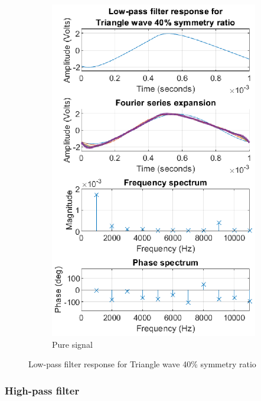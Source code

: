 \documentclass[notitlepage, a4paper, 11pt]{article}
\begin{document}
\begin{figure}[H]
\begin{subfigure}{0.45\textwidth}
			\includegraphics[width=\textwidth]{../Matlab/img/RCLPtri40}
			\caption{Pure signal}
		\end{subfigure}
		\caption{Low-pass filter response for Triangle wave 40\% symmetry ratio}
	\end{figure}
	
	\subsubsection{High-pass filter}
	
\end{document}
